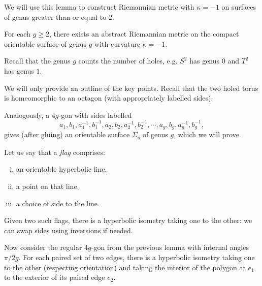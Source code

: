 \documentclass[12pt]{article}
\begin{document}
We will use this lemma to construct Riemannian metric with $\kappa = -1$ on surfaces of genus greater than or equal to $2$.


\begin{theorem}
	For each $g \ge 2$, there exists an abstract Riemannian metric on the compact orientable surface of genus $g$ with curvature $\kappa = -1$.
\end{theorem}

Recall that the genus $g$ counts the number of holes, e.g. $S^{2}$ has genus $0$ and $T^{2}$ has genus $1$.

\begin{proofbox}
	We will only provide an outline of the key points. Recall that the two holed torus is homeomorphic to an octagon (with appropriately labelled sides).

	Analogously, a $4g$-gon with sides labelled 
	\[
	a_1, b_1, a_1^{-1}, b_1^{-1}, a_2, b_2, a_2^{-1}, b_2^{-1}, \cdots, a_g, b_g, a_g^{-1}, b_g^{-1},
	\]
	gives (after gluing) an orientable surface $\Sigma_g$ of genus $g$, which we will prove.

	Let us say that a \emph{flag} comprises:
	\begin{enumerate}[(i)]%
		\item an orientable hyperbolic line,
		\item a point on that line,
		\item a choice of side to the line.
	\end{enumerate}
	Given two such flags, there is a hyperbolic isometry taking one to the other: we can swap sides using inversions if needed.

	Now consider the regular $4g$-gon from the previous lemma with internal angles $\pi/2g$. For each paired set of two edges, there is a hyperbolic isometry taking one to the other (respecting orientation) and taking the interior of the polygon at $e_1$ to the exterior of its paired edge $e_2$.


\end{proofbox}
\end{document}
